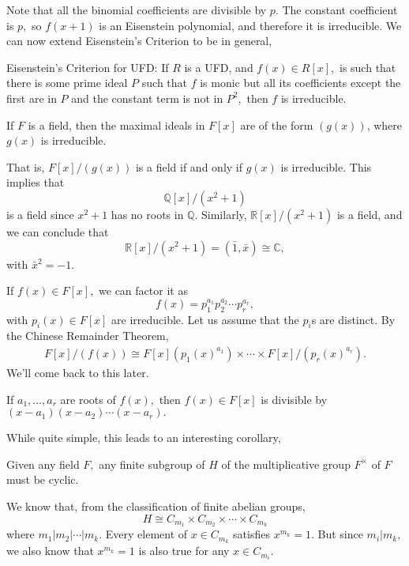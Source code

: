 \documentclass{article}
\numberwithin{equation}{section}
\begin{document}
Note that all the binomial coefficients are divisible by $p.$ The constant coefficient is $p,$ so $f(x+1)$ is an Eisenstein polynomial, and therefore it is irreducible. We can now extend Eisenstein's Criterion to be in general,
\begin{theorem}
    Eisenstein's Criterion for UFD: If $R$ is a UFD, and $f(x) \in R[x],$ is such that there is some prime ideal $P$ such that $f$ is monic but all its coefficients except the first are in $P$ and the constant term is not in $P^2,$ then $f$ is irreducible.
\end{theorem}
\begin{theorem}
    If $F$ is a field, then the maximal ideals in $F[x]$ are of the form $(g(x))$, where $g(x)$ is irreducible.
\end{theorem}
That is, $F[x]/(g(x))$ is a field if and only if $g(x)$ is irreducible. This implies that 
\begin{equation}
    \mathbb{Q}[x]/(x^2+1)
\end{equation}
is a field since $x^2+1$ has no roots in $\mathbb{Q}.$ Similarly, $\mathbb{R}[x]/(x^2+1)$ is a field, and we can conclude that
\begin{equation}
    \mathbb{R}[x]/(x^2+1) = (\bar{1},\bar{x}) \cong \mathbb{C},
\end{equation}
with $\bar{x}^2=-1.$ 

If $f(x) \in F[x],$ we can factor it as 
\begin{equation}
    f(x) = p_1^{a_1}p_2^{a_2}\cdots p_r^{a_r},
\end{equation}
with $p_i(x) \in F[x]$ are irreducible. Let us assume that the $p_i$s are distinct. By the Chinese Remainder Theorem,
\begin{align*}
    F[x]/(f(x)) \cong F[x](p_1(x)^{a_1}) \times \cdots \times F[x]/(p_r(x)^{a_r}).
\end{align*}
We'll come back to this later.
\begin{proposition}
    If $a_1,\dots,a_r$ are roots of $f(x),$ then $f(x) \in F[x]$ is divisible by $(x-a_1)(x-a_2)\cdots (x-a_r).$
\end{proposition}
While quite simple, this leads to an interesting corollary,
\begin{corollary}
    Given any field $F,$ any finite subgroup of $H$ of the multiplicative group $F^\times$ of $F$ must be cyclic.
\end{corollary}
We know that, from the classification of finite abelian groups, 
\begin{equation}
    H \cong C_{m_1} \times C_{m_2} \times \cdots \times C_{m_k}
\end{equation}
where $m_1|m_2|\cdots | m_k.$ Every element of $x\in C_{m_k}$ satisfies $x^{m_k}=1.$ But since $m_i|m_k,$ we also know that $x^{m_k}=1$ is also true for any $x\in C_{m_i}.$
\end{document}
